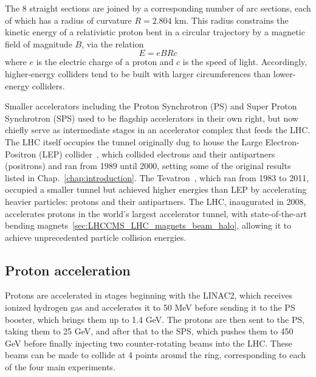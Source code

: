 \documentclass[oneside, letterpaper, 12pt, oldfontcommands]{memoir}
\begin{document}
The 8 straight sections are joined by a corresponding number of arc sections, each of which
has a radius of curvature $R = 2.804$ km. This radius constrains the kinetic energy of a relativistic proton
bent in a circular trajectory by a magnetic field of magnitude $B$, via the relation
\begin{equation}
E = eBRc
\end{equation}
where $e$ is the electric charge of a proton and $c$ is the speed of light. Accordingly, higher-energy
colliders tend to be built with larger circumferences than lower-energy colliders.

Smaller accelerators including the Proton Synchrotron (PS) and Super Proton Synchrotron (SPS) used to be flagship accelerators
in their own right, but now chiefly serve as intermediate stages in an accelerator complex that feeds the LHC.
The LHC itself occupies the tunnel originally dug to house the Large Electron-Positron (LEP) collider~\cite{ref:SchopperLEP}, which collided
electrons and their antipartners (positrons) and ran from 1989 until 2000, setting some of the original results
listed in Chap.~\ref{chap:introduction}. The Tevatron~\cite{ref:TevatronPhysics}, which ran from 1983 to 2011, occupied a smaller tunnel
but achieved higher energies than LEP by accelerating heavier particles: protons and their antipartners. The LHC, inaugurated in 2008,
accelerates protons in the world's largest accelerator tunnel, with state-of-the-art bending
magnets~\ref{sec:LHCCMS_LHC_magnets_beam_halo}, allowing it to achieve unprecedented particle collision energies.

\subsection{Proton acceleration} \label{sec:LHCCMS_LHC_proton_acceleration}
Protons are accelerated in stages beginning with the LINAC2, which receives ionized hydrogen
gas and accelerates it to 50 MeV before sending it to the PS booster,
which brings them up to 1.4 GeV. The protons are then sent to the PS, taking them to 25 GeV,
and after that to the SPS, which pushes them to 450 GeV before finally injecting two counter-rotating
beams into the LHC. These beams can be made to collide at 4 points around the ring, corresponding to each of the four
main experiments.
\end{document}

